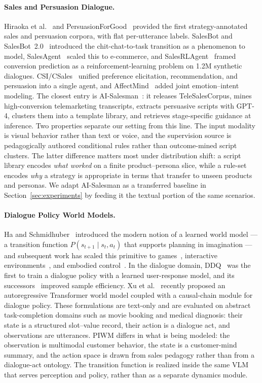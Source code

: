 \documentclass{article}
\begin{document}
\paragraph{Sales and Persuasion Dialogue.}
Hiraoka et al.~\cite{Hiraoka2016} and PersuasionForGood~\cite{PersuasionForGood} provided the first strategy-annotated sales and persuasion corpora, with flat per-utterance labels. SalesBot and SalesBot~2.0~\cite{SalesBot,SalesBot2} introduced the chit-chat-to-task transition as a phenomenon to model, SalesAgent~\cite{SalesAgent} scaled this to e-commerce, and SalesRLAgent~\cite{SalesRLAgent} framed conversion prediction as a reinforcement-learning problem on 1.2M synthetic dialogues. CSI/CSales~\cite{CSales} unified preference elicitation, recommendation, and persuasion into a single agent, and AffectMind~\cite{AffectMind} added joint emotion--intent modeling. The closest entry is AI-Salesman~\cite{AISalesman}: it releases TeleSalesCorpus, mines high-conversion telemarketing transcripts, extracts persuasive scripts with GPT-4, clusters them into a template library, and retrieves stage-specific guidance at inference. Two properties separate our setting from this line. The input modality is visual behavior rather than text or voice, and the supervision source is pedagogically authored conditional rules rather than outcome-mined script clusters. The latter difference matters most under distribution shift: a script library encodes \emph{what worked} on a finite product--persona slice, while a rule-set encodes \emph{why} a strategy is appropriate in terms that transfer to unseen products and personas. We adapt AI-Salesman as a transferred baseline in Section~\ref{sec:experiments} by feeding it the textual portion of the same scenarios.

\paragraph{Dialogue Policy World Models.}
Ha and Schmidhuber~\cite{HaSchmidhuber} introduced the modern notion of a learned world model --- a transition function $P(s_{t+1} \mid s_t, a_t)$ that supports planning in imagination --- and subsequent work has scaled this primitive to games~\cite{IRIS}, interactive environments~\cite{Genie}, and embodied control~\cite{DreamerV3}. In the dialogue domain, DDQ~\cite{DDQ} was the first to train a dialogue policy with a learned user-response model, and its successors~\cite{SwitchDDQ,BudgetDDQ,DRD3Q} improved sample efficiency. Xu et al.~\cite{XuCOLING} recently proposed an autoregressive Transformer world model coupled with a causal-chain module for dialogue policy. These formulations are text-only and are evaluated on abstract task-completion domains such as movie booking and medical diagnosis: their state is a structured slot--value record, their action is a dialogue act, and observations are utterances. PIWM differs in what is being modeled: the observation is multimodal customer behavior, the state is a customer-mind summary, and the action space is drawn from sales pedagogy rather than from a dialogue-act ontology. The transition function is realized inside the same VLM that serves perception and policy, rather than as a separate dynamics module.
\end{document}
